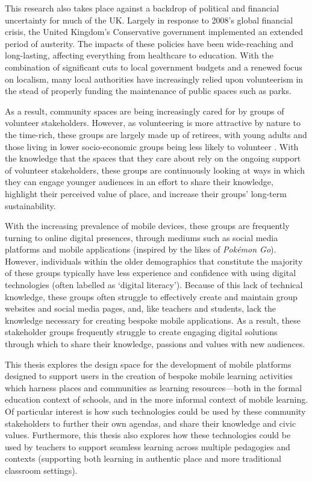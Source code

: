 This research also takes place against a backdrop of political and financial uncertainty for much of the UK. Largely in response to 2008's global financial crisis, the United Kingdom's Conservative government implemented an extended period of austerity. The impacts of these policies have been wide-reaching and long-lasting, affecting everything from healthcare to education. With the combination of significant cuts to local government budgets and a renewed focus on localism, many local authorities have increasingly relied upon volunteerism in the stead of properly funding the maintenance of public spaces such as parks.

As a result, community spaces are being increasingly cared for by groups of volunteer stakeholders. However, as volunteering is more attractive by nature to the time-rich, these groups are largely made up of retirees, with young adults and those living in lower socio-economic groups being less likely to volunteer \citep{ncvo2019}. With the knowledge that the spaces that they care about rely on the ongoing support of volunteer stakeholders, these groups are continuously looking at ways in which they can engage younger audiences in an effort to share their knowledge, highlight their perceived value of place, and increase their groups' long-term sustainability. 

With the increasing prevalence of mobile devices, these groups are frequently turning to online digital presences, through mediums such as social media platforms and mobile applications (inspired by the likes of \textit{Pok\'emon Go}). However, individuals within the older demographics that constitute the majority of these groups typically have less experience and confidence with using digital technologies (often labelled as `digital literacy'). Because of this lack of technical knowledge, these groups often struggle to effectively create and maintain group websites and social media pages, and, like teachers and students, lack the knowledge necessary for creating bespoke mobile applications. As a result, these stakeholder groups frequently struggle to create engaging digital solutions through which to share their knowledge, passions and values with new audiences.

This thesis explores the design space for the development of mobile platforms designed to support users in the creation of bespoke mobile learning activities which harness places and communities as learning resources---both in the formal education context of schools, and in the more informal context of mobile learning. Of particular interest is how such technologies could be used by these community stakeholders to further their own agendas, and share their knowledge and civic values. Furthermore, this thesis also explores how these technologies could be used by teachers to support seamless learning across multiple pedagogies and contexts (supporting both learning in authentic place and more traditional classroom settings).

